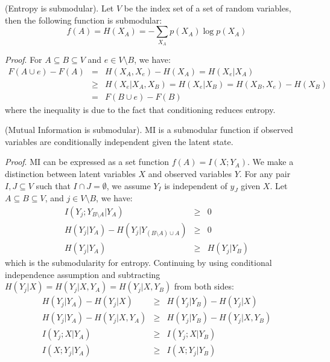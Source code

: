 \begin{theorem}
(Entropy is submodular). Let $V$ be the index set of a set of random variables, then the following function is submodular:
\begin{equation}
    f(A) = H(X_A) = - \sum_{X_A} p(X_A)\log p(X_A)
\end{equation}
\end{theorem}
\textit{Proof}. For $A \subseteq B \subseteq V$ and $e \in V \setminus B$, we have:
\begin{eqnarray}
    F(A\cup {e}) - F(A) &=& H(X_A,X_e) - H(X_A) = H(X_e|X_A) \\
                        &\geq& H(X_e|X_A, X_B) = H(X_e|X_B) =  H(X_B,X_e) - H(X_B) \\
                        &=& F(B\cup {e}) - F(B)
\end{eqnarray}
where the inequality is due to the fact that conditioning reduces entropy. 

\begin{theorem}
(Mutual Information is submodular). MI is a submodular function if observed variables are conditionally independent given the latent state. 
\end{theorem}
\textit{Proof}. MI can be expressed as a set function $f(A) = I(X;Y_A)$. We make a distinction between latent variables $X$ and observed variables $Y$. For any pair $I, J \subseteq V$ such that $I \cap J = \emptyset$, we assume $Y_I$ is independent of $y_J$ given $X$. Let $A\subseteq B\subseteq V$, and $j \in V\setminus B$, we have:
\begin{eqnarray}
    I(Y_j; Y_{B\setminus A} | Y_A) &\geq& 0 \\
    H(Y_j|Y_A) - H(Y_j|Y_{(B\setminus A)\cup A}) &\geq& 0 \\
    H(Y_j|Y_A) &\geq& H(Y_j|Y_B)
\end{eqnarray}
which is the submodularity for entropy. Continuing by using conditional independence assumption and subtracting $H(Y_j|X)=H(Y_j|X,Y_A)=H(Y_j|X,Y_B)$ from both sides:
\begin{eqnarray}
    H(Y_j|Y_A) - H(Y_j|X) &\geq& H(Y_j|Y_B) - H(Y_j|X)\\
    H(Y_j|Y_A) - H(Y_j|X,Y_A) &\geq& H(Y_j|Y_B) - H(Y_j|X, Y_B)\\
    I(Y_j;X|Y_A) &\geq& I(Y_j;X|Y_B) \\
    I(X;Y_j|Y_A) &\geq& I(X;Y_j|Y_B) 
\end{eqnarray}










